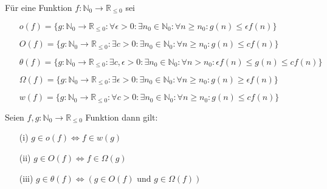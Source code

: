     Für eine Funktion \(f: \mathbb{N}_0 \to \mathbb{R}_{\leq 0}\) sei
    \begin{itemize}
        \item [] \(o(f) = \{g: \mathbb{N}_0 \to \mathbb{R}_{\leq 0} : \forall \epsilon > 0 : \exists n_0 \in \mathbb{N}_0 : \forall n \geq n_0 : g(n) \leq \epsilon f(n)\}\)
        \item [] \(O(f) = \{g: \mathbb{N}_0 \to \mathbb{R}_{\leq 0} : \exists c > 0 : \exists n_0 \in \mathbb{N}_0 : \forall n \geq n_0 : g(n) \leq c f(n)\}\)
        \item [] \(\theta(f) = \{g: \mathbb{N}_0 \to \mathbb{R}_{\leq 0} : \exists c, \epsilon > 0 : \exists n_0 \in \mathbb{N}_0 : \forall n > n_0 : \epsilon f(n) \leq g(n) \leq cf(n)\}\)
        \item [] \(\Omega (f) = \{g: \mathbb{N}_0 \to \mathbb{R}_{\leq 0} : \exists \epsilon > 0 : \exists n_0 \in \mathbb{N}_0 : \forall n \geq n_0 : g(n) \geq \epsilon f(n)\}\)
        \item [] \(w(f) = \{g: \mathbb{N}_0 \to \mathbb{R}_{\leq 0} : \forall c > 0 : \exists n_0 \in \mathbb{N}_0 : \forall n \geq n_0 : g(n) \leq c f(n)\}\)
    \end{itemize}

    Seien \(f, g : \mathbb{N}_0 \to \mathbb{R}_{\leq 0}\) Funktion dann gilt:
    \begin{itemize}
        \item [(i)] \(g \in o(f) \Leftrightarrow f \in w(g)\)
        \item [(ii)] \(g \in O(f) \Leftrightarrow f \in \Omega(g)\)
        \item [(iii)] \(g \in \theta(f) \Leftrightarrow ( g \in O(f) \text{ und }g \in \Omega(f))\)
    \end{itemize}

